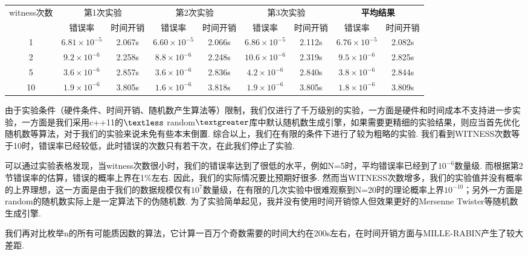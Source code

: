 \documentclass[UTF8]{ctexart}
\begin{document}
\begin{table}[H]
    \begin{center}
    \renewcommand{\arraystretch}{1.2}
    \begin{tabular}{ccccccccc}
    \toprule
    \multirow{2.5}{*}{witness次数} &
    \multicolumn{2}{c}{第1次实验}&\multicolumn{2}{c}{第2次实验}&\multicolumn{2}{c}{第3次实验}&\multicolumn{2}{c}{\textbf{平均结果}}\\
    \cmidrule{2-3}\cmidrule{4-5}\cmidrule{6-7}\cmidrule{8-9}
      & 错误率 & 时间开销& 错误率 & 时间开销 &错误率 & 时间开销&错误率 & 时间开销 \\
    \midrule
    1 & $6.81\times 10^{-5}$ & 2.067s &$ 6.60\times 10^{-5} $& 2.066s & $6.86\times 10^{-5}$& 2.112s&$6.76\times 10^{-5}$& 2.082s\\
    2 & $9.2\times 10^{-6}$ & 2.258s &$ 8.8\times 10^{-6} $& 2.248s & $10.6\times 10^{-6}$& 2.319s& $9.5\times 10^{-6}$ & 2.825s \\
    5 & $3.6\times 10^{-6}$ & 2.857s &$ 3.6\times 10^{-6} $& 2.836s & $4.2\times 10^{-6}$& 2.840s& $3.8\times 10^{-6}$ & 2.844s\\
    10 &  $1.9\times 10^{-6}$ & 3.805s &$ 1.6\times 10^{-6} $& 3.818s & $1.9\times 10^{-6}$& 3.805s& $1.8\times 10^{-6}$ & 3.809s\\
    \bottomrule
    \end{tabular}
    \end{center}
\end{table}
    由于实验条件（硬件条件、时间开销、随机数产生算法等）限制，我们仅进行了千万级别的实验，一方面是硬件和时间成本不支持进一步实验，一方面是我们采用c++11的$\textless$ random$\textgreater$库中默认随机数生成引擎，如果需要更精细的实验结果，则应当首先优化随机数等算法，对于我们的实验来说未免有些本末倒置. 综合以上，我们在有限的条件下进行了较为粗略的实验. 我们看到WITNESS次数等于10时，错误率已经较低，此时错误的次数只有若干次，在此我们停止了实验.\par
    可以通过实验表格发现，当witness次数很小时，我们的错误率达到了很低的水平，例如N=5时，平均错误率已经到了$10^{-6}$数量级. 而根据第2节错误率的估算，错误的概率上界在1\%左右. 因此，我们的实际情况要比预期好很多. 然而当WITNESS次数增多，我们的实验值并没有概率的上界理想，这一方面是由于我们的数据规模仅有$10^{7}$数量级，在有限的几次实验中很难观察到N=20时的理论概率上界$10^{-10}$；另外一方面是random的随机数实际上是一定算法下的伪随机数. 为了实验简单起见，我并没有使用时间开销惊人但效果更好的Mersenne Twister等随机数生成引擎.\par
    我们再对比枚举n的所有可能质因数的算法，它计算一百万个奇数需要的时间大约在200s左右，在时间开销方面与MILLE-RABIN产生了较大差距.
    
\end{document}
